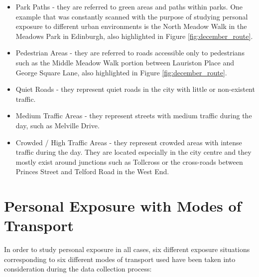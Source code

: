 \documentclass[bsc,frontabs,twoside,singlespacing,parskip,deptreport]{infthesis}     %
\begin{document}
\begin{itemize}
\item Park Paths - they are referred to green areas and paths within parks. One example that was constantly scanned with the purpose of studying personal exposure to different urban environments is the North Meadow Walk in the Meadows Park in Edinburgh, also highlighted in Figure \ref{fig:december_route}.

\item Pedestrian Areas - they are referred to roads accessible only to pedestrians such as the Middle Meadow Walk portion between Lauriston Place and George Square Lane, also highlighted in Figure \ref{fig:december_route}.

\item Quiet Roads - they represent quiet roads in the city with little or non-existent traffic.

\item Medium Traffic Areas - they represent streets with medium traffic during the day, such as Melville Drive.

\item Crowded / High Traffic Areas - they represent crowded areas with intense traffic during the day. They are located especially in the city centre and they mostly exist around junctions such as Tollcross or the cross-roads between Princes Street and Telford Road in the West End. 
\end{itemize}
\label{list:urban-environments}

\section{Personal Exposure with Modes of Transport}

In order to study personal exposure in all cases, six different exposure situations corresponding to six different modes of transport used have been taken into consideration during the data collection process:
\end{document}
